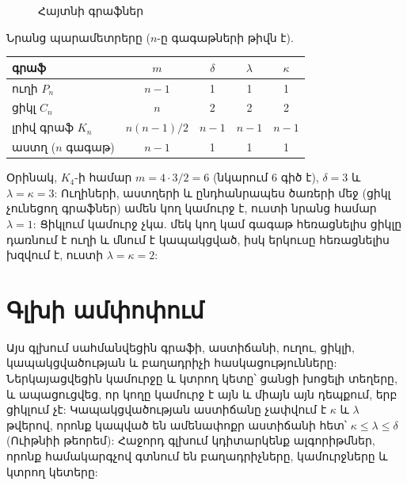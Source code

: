 \begin{figure}[h]
\centering
{}
\caption{Հայտնի գրաֆներ}\label{fig:std}
\end{figure}

Նրանց պարամետրերը ($n$-ը գագաթների թիվն է).
\begin{center}
\begin{tabular}{lcccc}
\hline
գրաֆ & $m$ & $\delta$ & $\lambda$ & $\kappa$\\
\hline
ուղի $P_n$ & $n-1$ & 1 & 1 & 1\\
ցիկլ $C_n$ & $n$ & 2 & 2 & 2\\
լրիվ գրաֆ $K_n$ & $n(n-1)/2$ & $n-1$ & $n-1$ & $n-1$\\
աստղ ($n$ գագաթ) & $n-1$ & 1 & 1 & 1\\
\hline
\end{tabular}
\end{center}

Օրինակ, $K_4$-ի համար $m=4\cdot3/2=6$ (նկարում 6 գիծ է), $\delta=3$ և $\lambda=\kappa=3$: Ուղիների, աստղերի և ընդհանրապես ծառերի մեջ (ցիկլ չունեցող գրաֆներ) ամեն կող կամուրջ է, ուստի նրանց համար $\lambda=1$: Ցիկլում կամուրջ չկա. մեկ կող կամ գագաթ հեռացնելիս ցիկլը դառնում է ուղի և մնում է կապակցված, իսկ երկուսը հեռացնելիս խզվում է, ուստի $\lambda=\kappa=2$:

\section{Գլխի ամփոփում}

Այս գլխում սահմանվեցին գրաֆի, աստիճանի, ուղու, ցիկլի, կապակցվածության և բաղադրիչի հասկացությունները: Ներկայացվեցին կամուրջը և կտրող կետը՝ ցանցի խոցելի տեղերը, և ապացուցվեց, որ կողը կամուրջ է այն և միայն այն դեպքում, երբ ցիկլում չէ: Կապակցվածության աստիճանը չափվում է $\kappa$ և $\lambda$ թվերով, որոնք կապված են ամենափոքր աստիճանի հետ՝ $\kappa\le\lambda\le\delta$ (Ուիթնիի թեորեմ): Հաջորդ գլխում կդիտարկենք ալգորիթմներ, որոնք համակարգչով գտնում են բաղադրիչները, կամուրջները և կտրող կետերը:
